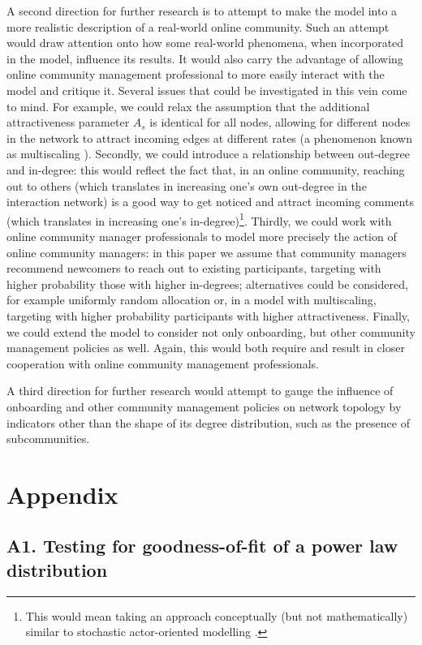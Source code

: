 \documentclass{bmcart}
\begin{document}
A second direction for further research is to attempt to make the model into a more realistic description of a real-world online community. Such an attempt would draw attention onto how some real-world phenomena, when incorporated in the model, influence its results. It would also carry the advantage of allowing online community management professional to more easily interact with the model and critique it. Several issues that could be investigated in this vein come to mind. For example, we could relax the assumption that the additional attractiveness parameter $A_s$ is identical for all nodes, allowing for different nodes in the network to attract incoming edges at different rates (a phenomenon known as multiscaling \cite{bianconi2001competition}). Secondly, we could introduce a relationship between out-degree and in-degree: this would reflect the fact that, in an online community, reaching out to others (which translates in increasing one's own out-degree in the interaction network) is a good way to get noticed and attract incoming comments (which translates in increasing one's in-degree)\footnote{This would mean taking an approach conceptually (but not mathematically) similar to stochastic actor-oriented modelling \cite{snijders1996stochastic}.}. Thirdly, we could work with online community manager professionals to model more precisely the action of online community managers: in this paper we assume that community managers recommend newcomers to reach out to existing participants, targeting with higher probability those with higher in-degrees; alternatives could be considered, for example uniformly random allocation or, in a model with multiscaling, targeting with higher probability participants with higher attractiveness. Finally, we could extend the model to consider not only onboarding, but other community management policies as well. Again, this would both require and result in closer cooperation with online community management professionals.

A third direction for further research would attempt to gauge the influence of onboarding and other community management policies on network topology by indicators other than the shape of its degree distribution, such as the presence of subcommunities. 


\section*{Appendix}
\subsection*{A1. Testing for goodness-of-fit of a power law distribution}
\end{document}
